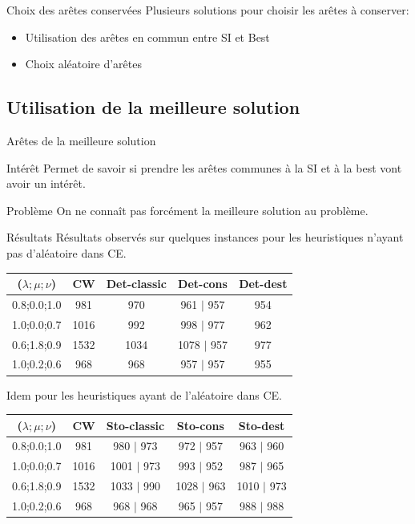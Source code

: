 \documentclass{beamer}
\begin{document}
\begin{frame}{Choix des arêtes conservées}
Plusieurs solutions pour choisir les arêtes à conserver:
\begin{itemize}
\item Utilisation des arêtes en commun entre SI et Best
\item Choix aléatoire d'arêtes
\end{itemize}
\end{frame}

\subsection{Utilisation de la meilleure solution}
\begin{frame}{Arêtes de la meilleure solution}
\begin{block}{Intérêt}
Permet de savoir si prendre les arêtes communes à la SI et à la best vont avoir un intérêt.
\end{block}
\begin{alertblock}{Problème}
On ne connaît pas forcément la meilleure solution au problème. 
\end{alertblock}
\end{frame}

\begin{frame}{Résultats}
Résultats observés sur quelques instances pour les heuristiques n'ayant pas d'aléatoire dans CE.
\begin{tabular}{|c|c|c|c|c|}
   \hline
   ($\lambda;\mu;\nu$) & CW & Det-classic & Det-cons & Det-dest \\
   \hline
   0.8;0.0;1.0 & 981 & 970 & 961 $|$ 957 & 954 \\
   \hline
   1.0;0.0;0.7 & 1016 & 992 & 998 $|$ 977 & 962 \\
   \hline
   0.6;1.8;0.9 & 1532 & 1034 & 1078 $|$ 957 & 977\\
   \hline
   1.0;0.2;0.6 & 968 & 968 & 957 $|$ 957 & 955 \\
   \hline
\end{tabular}

Idem pour les heuristiques ayant de l'aléatoire dans CE.
\begin{tabular}{|c|c|c|c|c|}
   \hline
   ($\lambda;\mu;\nu$) & CW & Sto-classic & Sto-cons & Sto-dest \\
   \hline
   0.8;0.0;1.0 &981 & 980 $|$ 973 & 972 $|$ 957 & 963 $|$ 960 \\
   \hline
   1.0;0.0;0.7 &1016& 1001 $|$ 973 & 993 $|$ 952 & 987 $|$ 965 \\
   \hline
   0.6;1.8;0.9 &1532& 1033 $|$ 990 & 1028 $|$ 963 & 1010 $|$ 973\\
   \hline
   1.0;0.2;0.6 &968& 968 $|$ 968 & 965 $|$ 957 & 988 $|$ 988 \\
   \hline
\end{tabular}
\end{frame}
\end{document}
